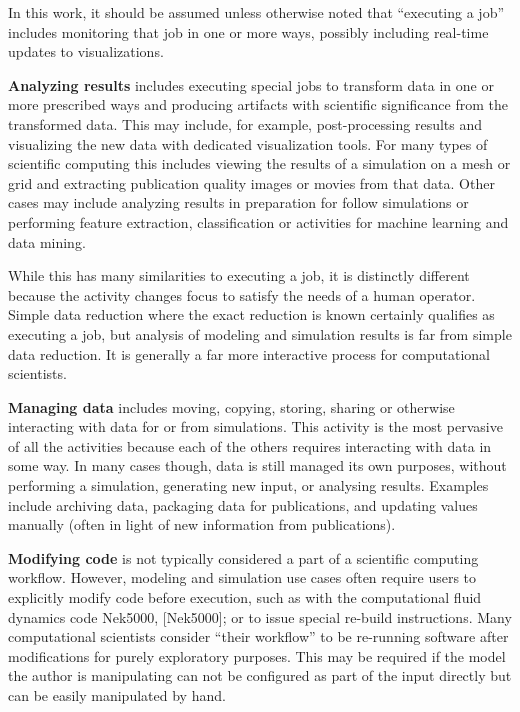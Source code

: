 In this work, it should be assumed unless otherwise noted that
``executing a job'' includes monitoring that job in one or more ways,
possibly including real-time updates to visualizations.

\textbf{Analyzing results} includes executing special jobs to transform
data in one or more prescribed ways and producing artifacts with
scientific significance from the transformed data. This may include, for
example, post-processing results and visualizing the new data with
dedicated visualization tools. For many types of scientific computing
this includes viewing the results of a simulation on a mesh or grid and
extracting publication quality images or movies from that data. Other
cases may include analyzing results in preparation for follow
simulations or performing feature extraction, classification or
activities for machine learning and data mining.

While this has many similarities to executing a job, it is distinctly
different because the activity changes focus to satisfy the needs of a
human operator. Simple data reduction where the exact reduction is known
certainly qualifies as executing a job, but analysis of modeling and
simulation results is far from simple data reduction. It is generally a
far more interactive process for computational scientists.

\textbf{Managing data} includes moving, copying, storing, sharing or
otherwise interacting with data for or from simulations. This activity
is the most pervasive of all the activities because each of the others
requires interacting with data in some way. In many cases though, data
is still managed its own purposes, without performing a simulation,
generating new input, or analysing results. Examples include archiving
data, packaging data for publications, and updating values manually
(often in light of new information from publications).

\textbf{Modifying code} is not typically considered a part of a
scientific computing workflow. However, modeling and simulation use
cases often require users to explicitly modify code before execution,
such as with the computational fluid dynamics code Nek5000,
{[}Nek5000{]}; or to issue special re-build instructions. Many
computational scientists consider ``their workflow'' to be re-running
software after modifications for purely exploratory purposes. This may
be required if the model the author is manipulating can not be
configured as part of the input directly but can be easily manipulated
by hand.

